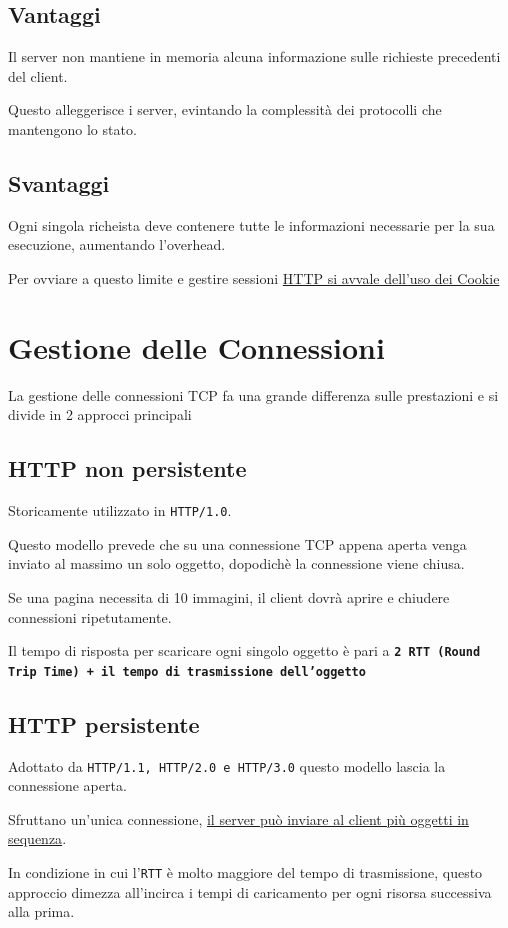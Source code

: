     \subsection{Vantaggi}
    Il server non mantiene in memoria alcuna informazione sulle richieste precedenti del client.

    Questo alleggerisce i server, evintando la complessità dei protocolli che mantengono lo stato.

    \subsection{Svantaggi}
    Ogni singola richeista deve contenere tutte le informazioni necessarie per la sua esecuzione, aumentando l'overhead.

    Per ovviare a questo limite e gestire sessioni \uline{HTTP si avvale dell'uso dei Cookie}

\section{Gestione delle Connessioni}
La gestione delle connessioni TCP fa una grande differenza sulle prestazioni e si divide in 2 approcci principali

\subsection{HTTP non persistente}
Storicamente utilizzato in \texttt{HTTP/1.0}.

Questo modello prevede che su una connessione TCP appena aperta venga inviato al massimo un solo oggetto, dopodichè la connessione viene chiusa.

Se una pagina necessita di 10 immagini, il client dovrà aprire e chiudere connessioni ripetutamente.

Il tempo di risposta per scaricare ogni singolo oggetto è pari a \textbf{\texttt{2 RTT (Round Trip Time) + il tempo di trasmissione dell'oggetto}}

\subsection{HTTP persistente}
Adottato da \texttt{HTTP/1.1, HTTP/2.0 e HTTP/3.0} questo modello lascia la connessione aperta.

Sfruttano un'unica connessione, \uline{il server può inviare al client più oggetti in sequenza}.

In condizione in cui l'\texttt{RTT} è molto maggiore del tempo di trasmissione, questo approccio dimezza all'incirca i tempi di caricamento per ogni risorsa successiva alla prima.

